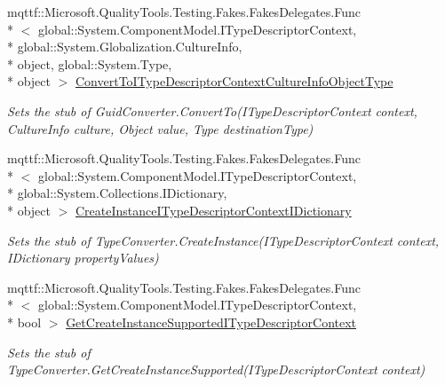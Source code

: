 \begin{DoxyCompactItemize}
mqttf\-::\-Microsoft.\-Quality\-Tools.\-Testing.\-Fakes.\-Fakes\-Delegates.\-Func\\*
$<$ global\-::\-System.\-Component\-Model.\-I\-Type\-Descriptor\-Context, \\*
global\-::\-System.\-Globalization.\-Culture\-Info, \\*
object, global\-::\-System.\-Type, \\*
object $>$ \hyperlink{class_system_1_1_component_model_1_1_fakes_1_1_stub_guid_converter_ab3ed4d1ad871aa6f02962f2a4ebb2f76}{Convert\-To\-I\-Type\-Descriptor\-Context\-Culture\-Info\-Object\-Type}
\begin{DoxyCompactList}\small\item\em Sets the stub of Guid\-Converter.\-Convert\-To(\-I\-Type\-Descriptor\-Context context, Culture\-Info culture, Object value, Type destination\-Type)\end{DoxyCompactList}\item 
mqttf\-::\-Microsoft.\-Quality\-Tools.\-Testing.\-Fakes.\-Fakes\-Delegates.\-Func\\*
$<$ global\-::\-System.\-Component\-Model.\-I\-Type\-Descriptor\-Context, \\*
global\-::\-System.\-Collections.\-I\-Dictionary, \\*
object $>$ \hyperlink{class_system_1_1_component_model_1_1_fakes_1_1_stub_guid_converter_a7a1ea3c3f6b44ed71da4a69243e5a05a}{Create\-Instance\-I\-Type\-Descriptor\-Context\-I\-Dictionary}
\begin{DoxyCompactList}\small\item\em Sets the stub of Type\-Converter.\-Create\-Instance(\-I\-Type\-Descriptor\-Context context, I\-Dictionary property\-Values)\end{DoxyCompactList}\item 
mqttf\-::\-Microsoft.\-Quality\-Tools.\-Testing.\-Fakes.\-Fakes\-Delegates.\-Func\\*
$<$ global\-::\-System.\-Component\-Model.\-I\-Type\-Descriptor\-Context, \\*
bool $>$ \hyperlink{class_system_1_1_component_model_1_1_fakes_1_1_stub_guid_converter_aeb5c12af0711a267f758b3aa413545f1}{Get\-Create\-Instance\-Supported\-I\-Type\-Descriptor\-Context}
\begin{DoxyCompactList}\small\item\em Sets the stub of Type\-Converter.\-Get\-Create\-Instance\-Supported(\-I\-Type\-Descriptor\-Context context)\end{DoxyCompactList}\item 

\end{DoxyCompactItemize}
